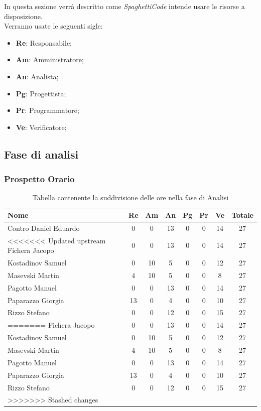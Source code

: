 \documentclass[../piano_di_progetto.tex]{subfiles}
\begin{document}
In questa sezione verrà descritto come \emph{SpaghettiCode} intende usare le risorse a disposizione. \\
Verranno usate le seguenti sigle:\par
\begin{itemize}
\item \textbf{Re}: Responsabile;
\item \textbf{Am}: Amministratore;
\item \textbf{An}: Analista;
\item \textbf{Pg}: Progettista;
\item \textbf{Pr}: Programmatore;
\item \textbf{Ve}: Verificatore;
\end{itemize}


\subsection{ Fase di analisi}%
\label{sub:fase_analisi}
\subsubsection{Prospetto Orario}


\begin{table}[!ht]
	\centering
	\begin{tabular}{|l|c|c|c|c|c|c|c|}
	\hline
	\rowcolor{lightgray}
	\textbf{Nome} & \textbf{Re} & \textbf{Am} & \textbf{An} & \textbf{Pg}  & \textbf{Pr}   & \textbf{Ve} & \textbf{Totale}\\
	\hline
		Contro Daniel Eduardo & 0 & 0 & 13 & 0 & 0 & 14 & 27 \\
<<<<<<< Updated upstream
		Fichera Jacopo & 0 & 0 & 13 & 0 & 0 & 14 & 27 \\
		Kostadinov Samuel & 0 & 10 & 5 & 0 & 0 & 12 & 27 \\			
		Masevski Martin & 4 & 10 & 5 & 0 & 0 & 8 & 27 \\
		Pagotto Manuel & 0 & 0 & 13 & 0 & 0 & 14 & 27 \\			
		Paparazzo Giorgia & 13 & 0 & 4 & 0 & 0 & 10 & 27 \\
		Rizzo Stefano & 0 & 0 & 12 & 0 & 0 & 15 & 27 \\
	\hline
=======
	\hline
		Fichera Jacopo &        0 & 0 & 13 & 0 & 0 & 14 & 27 \\
	\hline
		Kostadinov Samuel &     0 & 10 & 5 & 0 & 0 & 12 & 27 \\			
	\hline
		Masevski Martin &       4 & 10 & 5 & 0 & 0 & 8 & 27 \\
	\hline
		Pagotto Manuel &        0 & 0 & 13 & 0 & 0 & 14 & 27 \\			
	\hline
		Paparazzo Giorgia &     13 & 0 & 4 & 0 & 0 & 10 & 27 \\
	\hline
		Rizzo Stefano &         0 & 0 & 12 & 0 & 0 & 15 & 27 \\
	\hline	
>>>>>>> Stashed changes
	\end{tabular}
	\caption{Tabella contenente la suddivisione delle ore nella fase di Analisi}
\end{table}
\end{document}

